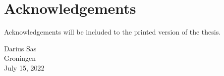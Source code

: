 \chapter*{Acknowledgements}
Acknowledgements will be included to the printed version of the thesis.
\begin{flushright}
Darius Sas\\
Groningen\\
July 15, 2022 %
\end{flushright}





